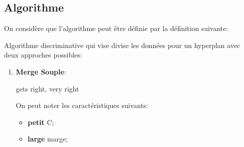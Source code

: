 \documentclass{article}
\begin{document}
\subsection{Algorithme}
On considère que l'algorithme peut être définie par la définition suivante:
\begin{definition}
    Algorithme discriminative qui vise divise les données pour un hyperplan avec deux approches possibles:
    \begin{enumerate}[rightmargin = \leftmargin]
        \item \textbf{Merge Souple}:
        \begin{definition}
            gets right, very right
        \end{definition}
        On peut noter les caractéristiques suivants:
        \begin{itemize}[noitemsep]
            \item \textbf{petit} C;
            \item \textbf{large} marge;
        \end{itemize}


\end{enumerate}
\end{definition}
\end{document}
